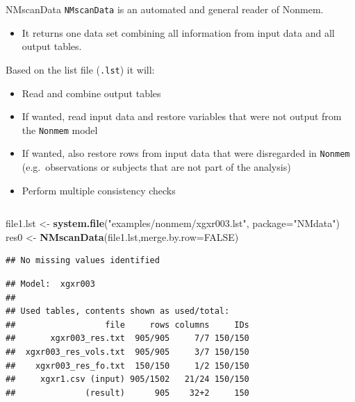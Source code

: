 \documentclass[
  8pt,
  ignorenonframetext,
  aspectratio=169]{beamer}
\newenvironment{Shaded}{\begin{snugshade}}{\end{snugshade}}
\newcommand{\DataTypeTok}[1]{\textcolor[rgb]{0.13,0.29,0.53}{#1}}
\newcommand{\KeywordTok}[1]{\textcolor[rgb]{0.13,0.29,0.53}{\textbf{#1}}}
\newcommand{\NormalTok}[1]{#1}
\newcommand{\OtherTok}[1]{\textcolor[rgb]{0.56,0.35,0.01}{#1}}
\newcommand{\StringTok}[1]{\textcolor[rgb]{0.31,0.60,0.02}{#1}}
\providecommand{\tightlist}{%
  \setlength{\itemsep}{0pt}\setlength{\parskip}{0pt}}
\begin{document}
\begin{frame}[fragile]{NMscanData}
\protect\hypertarget{nmscandata}{}
\texttt{NMscanData} is an automated and general reader of Nonmem.

\begin{itemize}
\tightlist
\item
  It returns one data set combining all information from input data and
  all output tables.
\end{itemize}

Based on the list file (\texttt{.lst}) it will:

\begin{itemize}
\tightlist
\item
  Read and combine output tables
\item
  If wanted, read input data and restore variables that were not output
  from the \texttt{Nonmem} model
\item
  If wanted, also restore rows from input data that were disregarded in
  \texttt{Nonmem} (e.g.~observations or subjects that are not part of
  the analysis)
\item
  Perform multiple consistency checks
\end{itemize}

\pause
\footnotesize

\begin{columns}[T]
\begin{column}{0.48\textwidth}
\begin{Shaded}
\begin{Highlighting}[]
\NormalTok{file1.lst \textless{}{-}}\StringTok{ }\KeywordTok{system.file}\NormalTok{(}\StringTok{"examples/nonmem/xgxr003.lst"}\NormalTok{,}
                         \DataTypeTok{package=}\StringTok{"NMdata"}\NormalTok{)}
\NormalTok{res0 \textless{}{-}}\StringTok{ }\KeywordTok{NMscanData}\NormalTok{(file1.lst,}\DataTypeTok{merge.by.row=}\OtherTok{FALSE}\NormalTok{)}
\end{Highlighting}
\end{Shaded}

\begin{verbatim}
## No missing values identified
\end{verbatim}

\begin{verbatim}
## Model:  xgxr003 
## 
## Used tables, contents shown as used/total:
##                  file     rows columns     IDs
##       xgxr003_res.txt  905/905     7/7 150/150
##  xgxr003_res_vols.txt  905/905     3/7 150/150
##    xgxr003_res_fo.txt  150/150     1/2 150/150
##     xgxr1.csv (input) 905/1502   21/24 150/150
##              (result)      905    32+2     150
\end{verbatim}


\end{column}
\end{columns}
\end{frame}
\end{document}
